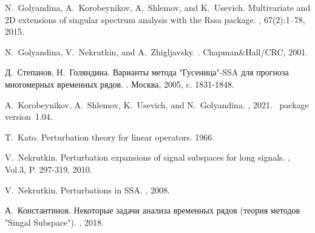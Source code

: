 \documentclass{spisok-article}
\begin{document}
\begin{thebibliography}{10}

N.~Golyandina, A.~Korobeynikov, A.~Shlemov, and K.~Usevich.
\newblock Multivariate and {2D} extensions of singular spectrum analysis with
  the {R}ssa package.
, 67(2):1--78, 2015.

N.~Golyandina, V.~Nekrutkin, and A.~Zhigljavsky.
.
\newblock Chapman\&Hall/CRC, 2001.

Д.~Степанов, Н.~Голяндина.
\newblock Варианты метода "Гусеница"{-SSA} для прогноза многомерных временных рядов.
. Москва, 2005, c. 1831-1848.

A.~Korobeynikov, A.~Shlemov, K.~Usevich, and N.~Golyandina.
, 2021.
~package version~1.04.

T.~Kato.
\newblock Perturbation theory for linear operators.
 1966.

V.~Nekrutkin.
\newblock Perturbation expansions of signal subspaces for long signals.
, Vol.3, P. 297-319, 2010.

V.~Nekrutkin.
\newblock Perturbations in SSA.
, 2008.

А.~Константинов.
\newblock Некоторые задачи анализа временных рядов (теория методов "Singal Subspace").
, 2018.

\end{thebibliography}
\end{document}
